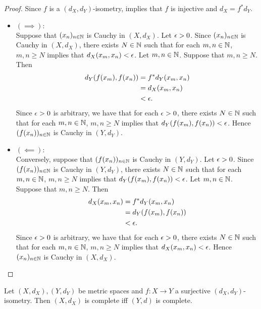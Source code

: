 \documentclass{book}
\begin{document}
\begin{proof} 
	Since $f$ is a $(d_X, d_Y)$-isometry,  implies that $f$ is injective and $d_X = f^*d_Y$.
	\begin{itemize}
		\item $(\implies):$ \\
			Suppose that $(x_n)_{n \in \mathbb{N}}$ is Cauchy in $(X, d_X)$. Let $\epsilon > 0$. Since $(x_n)_{n \in \mathbb{N}}$ is Cauchy in $(X, d_X)$, there exists $N \in \mathbb{N}$ such that for each $m, n \in \mathbb{N}$, $m, n \geq N$ implies that $d_X(x_m, x_n) < \epsilon$. Let $m, n \in \mathbb{N}$.  Suppose that $m,n \geq N$. Then 
		\begin{align*}
			d_Y(f(x_m), f(x_n))
			& = f^*d_Y(x_m, x_n) \\
			& = d_X(x_m, x_n) \\
			& < \epsilon.
		\end{align*}  
		Since $\epsilon > 0$ is arbitrary, we have that for each $\epsilon > 0$, there exists $N \in \mathbb{N}$ such that for each $m, n \in \mathbb{N}$, $m, n \geq N$ implies that $d_Y(f(x_m), f(x_n)) < \epsilon$. Hence $(f(x_n))_{n \in \mathbb{N}}$ is Cauchy in $(Y, d_Y)$.
		\item $(\impliedby):$ \\
		Conversely, suppose that $(f(x_n))_{n \in \mathbb{N}}$ is Cauchy in $(Y, d_Y)$. Let $\epsilon > 0$. Since $(f(x_n))_{n \in \mathbb{N}}$ is Cauchy in $(Y, d_Y)$, there exists $N \in \mathbb{N}$ such that for each $m, n \in \mathbb{N}$, $m, n \geq N$ implies that $d_Y(f(x_m), f(x_n)) < \epsilon$. Let $m, n \in \mathbb{N}$. Suppose that $m,n \geq N$. Then 
		\begin{align*}
			d_X(x_m, x_n)
			& = f^*d_Y(x_m, x_n) \\
			& = d_Y(f(x_m), f(x_n)) \\
			& < \epsilon. 
		\end{align*}  
		Since $\epsilon > 0$ is arbitrary, we have that for each $\epsilon > 0$, there exists $N \in \mathbb{N}$ such that for each $m, n \in \mathbb{N}$, $m, n \geq N$ implies that $d_X(x_m, x_n) < \epsilon$. Hence $(x_n)_{n \in \mathbb{N}}$ is Cauchy in $(X, d_X)$.
	\end{itemize}
\end{proof}

\begin{ex} 
	Let $(X, d_X), (Y, d_Y)$ be metric spaces and $f:X \rightarrow Y$ a surjective $(d_X, d_Y)$-isometry. Then $(X, d_X)$ is complete iff $(Y, d)$ is complete.
\end{ex}
\end{document}
